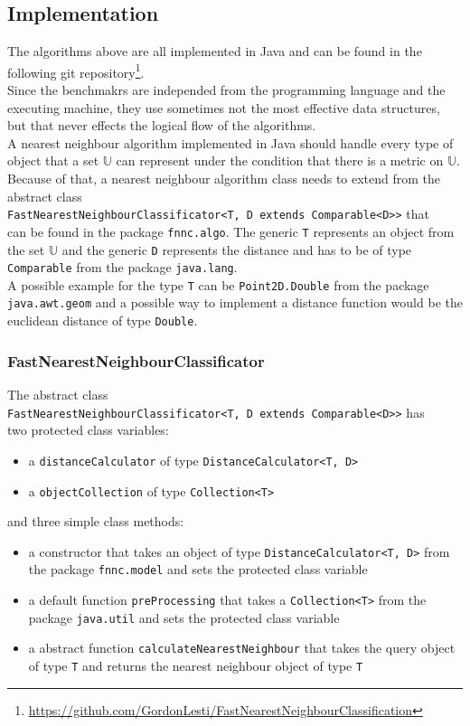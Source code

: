 \documentclass[runningheads,a4paper]{llncs}
\begin{document}
\subsection{Implementation}

The algorithms above are all implemented in Java and can be found in the following git
repository\footnote[1]{\url{https://github.com/GordonLesti/FastNearestNeighbourClassification}}.\\
Since the benchmakrs are independed from the programming language and the executing machine, they use sometimes not the
most effective data structures, but that never effects the logical flow of the algorithms.\\

A nearest neighbour algorithm implemented in Java should handle every type of object that a set $\mathbb{U}$ can
represent under the condition that there is a metric on $\mathbb{U}$. Because of that, a nearest neighbour algorithm
class needs to extend from the abstract class\\ \verb+FastNearestNeighbourClassificator<T, D extends Comparable<D>>+
that\\ can be found in the package \verb+fnnc.algo+. The generic \verb+T+ represents an object from the set $\mathbb{U}$
and the generic \verb+D+ represents the distance and has to be of type \verb+Comparable+ from the package
\verb+java.lang+.\\

A possible example for the type \verb+T+ can be \verb+Point2D.Double+ from the package
\verb+java.awt.geom+ and a possible way to implement a distance function would be the euclidean distance of type
\verb+Double+.

\subsubsection{FastNearestNeighbourClassificator}

The abstract class\\ \verb+FastNearestNeighbourClassificator<T, D extends Comparable<D>>+ has\\ two protected class
variables:
\begin{itemize}
	\item a \verb+distanceCalculator+ of type \verb+DistanceCalculator<T, D>+
	\item a \verb+objectCollection+ of type \verb+Collection<T>+
\end{itemize}
and three simple class methods:
\begin{itemize}
	\item a constructor that takes an object of type \verb+DistanceCalculator<T, D>+ from the package
		\verb+fnnc.model+ and sets the protected class variable
	\item a default function \verb+preProcessing+ that takes a \verb+Collection<T>+ from the package
		\verb+java.util+ and sets the protected class variable
	\item a abstract function \verb+calculateNearestNeighbour+ that takes the query object of type \verb+T+ and
		returns the nearest neighbour object of type \verb+T+
\end{itemize}
\end{document}
